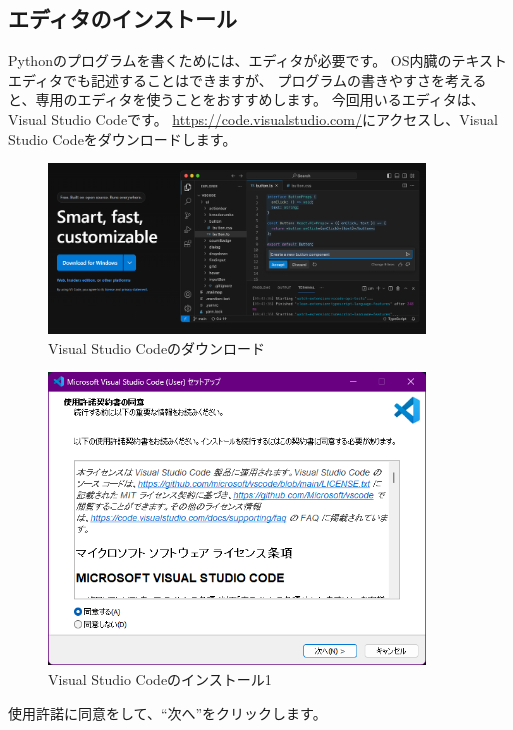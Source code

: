 \documentclass[a4paper,titlepage,dvipdfmx]{jarticle}
\begin{document}
\subsection{エディタのインストール}
Pythonのプログラムを書くためには、エディタが必要です。
OS内臓のテキストエディタでも記述することはできますが、
プログラムの書きやすさを考えると、専用のエディタを使うことをおすすめします。
今回用いるエディタは、Visual Studio Codeです。
\url{https://code.visualstudio.com/}にアクセスし、Visual Studio Codeをダウンロードします。

\begin{figure}[H]
  \centering
  \includegraphics[width=10cm]{./figs/vscode-download.png}
  \caption{Visual Studio Codeのダウンロード}
\end{figure}

\begin{figure}[H]
  \centering
  \includegraphics[width=10cm]{./figs/vscode-install1.png}
  \caption{Visual Studio Codeのインストール1}
\end{figure}
使用許諾に同意をして、``次へ''をクリックします。
\end{document}
